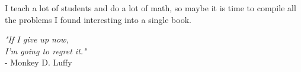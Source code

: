 I teach a lot of students and do a lot of math, so maybe it is time to compile all the problems I found interesting into a single book.

\vspace{2cm}

\begin{center}
    \textit{"If I give up now, }\\
    \textit{I’m going to regret it."} \\[5mm]
    - Monkey D. Luffy
\end{center}